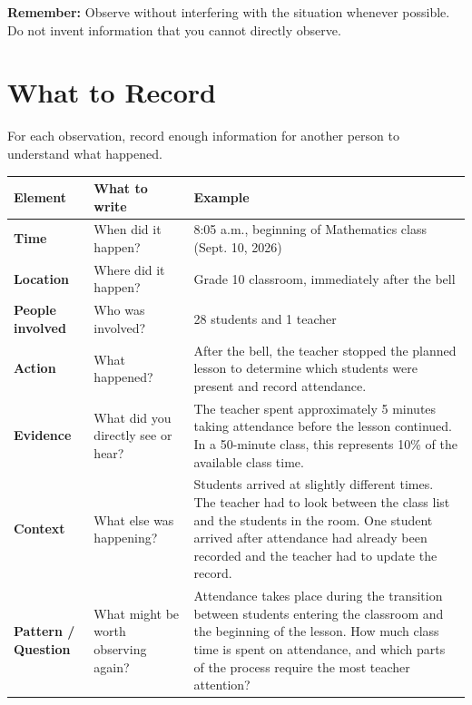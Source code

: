 \documentclass[12pt,a4paper]{article}
\begin{document}
	\vspace{0.2cm}
	
	\textbf{Remember:} Observe without interfering with the situation whenever possible. Do not invent information that you cannot directly observe.
	
	\section*{What to Record}
	
	For each observation, record enough information for another person to understand what happened.
	
	\begin{center}
		\small
		\begin{tabular}{|L{0.17\textwidth}|L{0.24\textwidth}|L{0.46\textwidth}|}
			\hline
			\textbf{Element} & \textbf{What to write} & \textbf{Example} \\
			\hline
			\textbf{Time} & When did it happen? 
			& 8:05 a.m., beginning of Mathematics class (Sept. 10, 2026) \\
			\hline
			\textbf{Location} & Where did it happen? 
			& Grade 10 classroom, immediately after the bell \\
			\hline
			\textbf{People involved} & Who was involved? 
			& 28 students and 1 teacher \\
			\hline
			\textbf{Action} & What happened? 
			& After the bell, the teacher stopped the planned lesson to determine which students were present and record attendance. \\
			\hline
			\textbf{Evidence} & What did you directly see or hear? 
			& The teacher spent approximately 5 minutes taking attendance before the lesson continued. In a 50-minute class, this represents 10\% of the available class time. \\
			\hline
			\textbf{Context} & What else was happening? 
			& Students arrived at slightly different times. The teacher had to look between the class list and the students in the room. One student arrived after attendance had already been recorded and the teacher had to update the record. \\
			\hline
			\textbf{Pattern / Question} & What might be worth observing again? 
			& Attendance takes place during the transition between students entering the classroom and the beginning of the lesson. How much class time is spent on attendance, and which parts of the process require the most teacher attention? \\
			\hline
		\end{tabular}
	\end{center}
	
\end{document}
